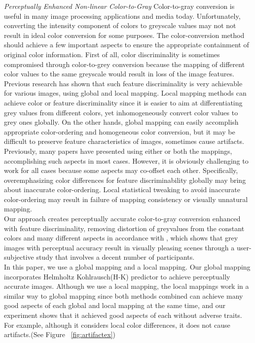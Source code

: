 \documentclass{article}
\begin{document}
{\it Perceptually Enhanced Non-linear Color-to-Gray}
Color-to-gray conversion is useful in many image processing applications and media today. Unfortunately, converting the intensity component of colors to greyscale values may not not result in ideal color conversion for some purposes. The color-conversion method should achieve a few important aspects to ensure the appropriate containment of original color information. First of all, color discriminality is sometimes compromised through color-to-grey conversion because the mapping of different color values to the same greyscale would result in loss of the image features. Previous research has shown that such feature discriminality is very achievable for various images, using global and local mapping. Local mapping methods can achieve color or feature discriminality since it is easier to aim at differentiating grey values from different colors, yet inhomogeneously convert color values to grey ones globally. On the other hands, global mapping can easily accomplish appropriate color-ordering and homogeneous color conversion, but it may be difficult to preserve feature characteristics of images, sometimes cause artifacts. Previously, many papers have presented using either or both the mappings, accomplishing such aspects in most cases. However, it is obviously challenging to work for all cases because some aspects may co-offset each other. Specifically, overemphasizing color differences for feature discriminability globally may bring about inaccurate color-ordering. Local statistical tweaking to avoid inaccurate color-ordering may result in failure of mapping consistency or visually unnatural mapping. \\
 Our approach creates perceptually accurate color-to-gray conversion enhanced with feature discriminality, removing distortion of greyvalues from the constant colors and many different aspects in accordance with \cite{cadik08perceptual}, which shows that grey images with perceptual accuracy result in visually pleasing scenes through a user-subjective study that involves a decent number of participants. \\
 In this paper, we use a global mapping and a local mapping. Our global mapping incorporates Helmholtz Kohlrausch(H-K) predictor to achieve perceptually accurate images. \cite{Nayatani97}  Although we use a local mapping, the local mappings work in a similar way to global mapping since both methods combined can achieve many good aspects of each global and local mapping at the same time, and our experiment shows that it achieved good aspects of each without adverse traits. For example, although it considers local color differences, it does not cause artifacts.(See Figure ~\ref{fig:artifactex}) \\
\end{document}

